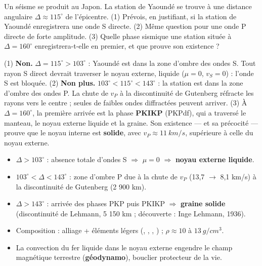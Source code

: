 \documentclass[11pt]{article}
\begin{document}
\begin{exercice}
Un séisme se produit au Japon. La station de Yaoundé se trouve à une distance angulaire $\Delta \approx 115^{\circ}$ de l'épicentre. (1) Prévois, en justifiant, si la station de Yaoundé enregistrera une onde S directe. (2) Même question pour une onde P directe de forte amplitude. (3) Quelle phase sismique une station située à $\Delta = 160^{\circ}$ enregistrera-t-elle en premier, et que prouve son existence ?
\end{exercice}

\begin{corrige}
(1) \textbf{Non.} $\Delta = 115^{\circ} > 103^{\circ}$ : Yaoundé est dans la zone d'ombre des ondes S. Tout rayon S direct devrait traverser le noyau externe, liquide ($\mu = 0$, $v_S = 0$) : l'onde S est bloquée. (2) \textbf{Non plus.} $103^{\circ} < 115^{\circ} < 143^{\circ}$ : la station est dans la zone d'ombre des ondes P. La chute de $v_P$ à la discontinuité de Gutenberg réfracte les rayons vers le centre ; seules de faibles ondes diffractées peuvent arriver. (3) À $\Delta = 160^{\circ}$, la première arrivée est la phase \textbf{PKIKP} (PKPdf), qui a traversé le manteau, le noyau externe liquide et la graine. Son existence — et sa précocité — prouve que le noyau interne est \textbf{solide}, avec $v_P \approx \SI{11}{km/s}$, supérieure à celle du noyau externe.
\end{corrige}

\begin{aretenir}
\begin{itemize}
\item $\Delta > 103^{\circ}$ : absence totale d'ondes S $\Rightarrow$ $\mu = 0$ $\Rightarrow$ \textbf{noyau externe liquide}.
\item $103^{\circ} < \Delta < 143^{\circ}$ : zone d'ombre P due à la chute de $v_P$ (13,7 $\to$ 8,1 km/s) à la discontinuité de Gutenberg (2 900 km).
\item $\Delta > 143^{\circ}$ : arrivée des phases PKP puis PKIKP $\Rightarrow$ \textbf{graine solide} (discontinuité de Lehmann, 5 150 km ; découverte : Inge Lehmann, 1936).
\item Composition : alliage  + éléments légers (, , , ) ; $\rho \approx 10$ à $\SI{13}{g/cm^3}$.
\item La convection du fer liquide dans le noyau externe engendre le champ magnétique terrestre (\textbf{géodynamo}), bouclier protecteur de la vie.
\end{itemize}
\end{aretenir}
\end{document}
